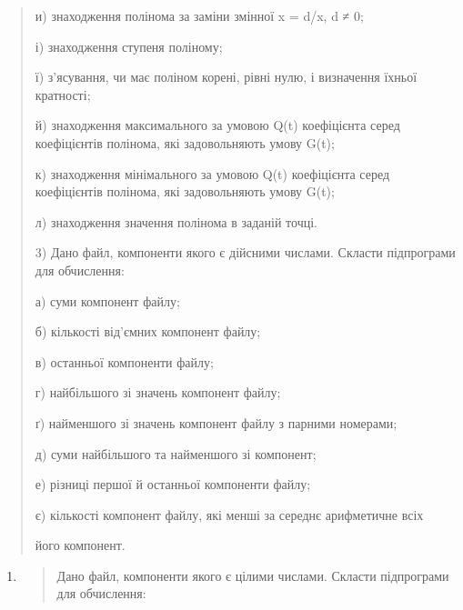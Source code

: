 \documentclass[]{article}
\begin{document}
\begin{quote}
и) знаходження полінома за заміни змінної x = d/x, d ≠ 0;

і) знаходження ступеня поліному;

ї) з'ясування, чи має поліном корені, рівні нулю, і визначення їхньої
кратності;

й) знаходження максимального за умовою Q(t) коефіцієнта серед
коефіцієнтів полінома, які задовольняють умову G(t);

к) знаходження мінімального за умовою Q(t) коефіцієнта серед
коефіцієнтів полінома, які задовольняють умову G(t);

л) знаходження значення полінома в заданій точці.

3) \protect\hypertarget{_Hlk65238097}{}{}Дано файл, компоненти якого є
дійсними числами. Скласти підпрограми для обчислення:

а) суми компонент файлу;

б) кількості від'ємних компонент файлу;

в) останньої компоненти файлу;

г) найбільшого зі значень компонент файлу;

ґ) найменшого зі значень компонент файлу з парними номерами;

д) суми найбільшого та найменшого зі компонент;

е) різниці першої й останньої компоненти файлу;

є) кількості компонент файлу, які менші за середнє арифметичне всіх

його компонент.
\end{quote}

\begin{enumerate}
\def\labelenumi{\arabic{enumi})}
\item
  \begin{quote}
  \protect\hypertarget{_Hlk65237989}{}{}Дано файл, компоненти якого є
  цілими числами. Скласти підпрограми для обчислення:
  \end{quote}
\end{enumerate}
\end{document}
